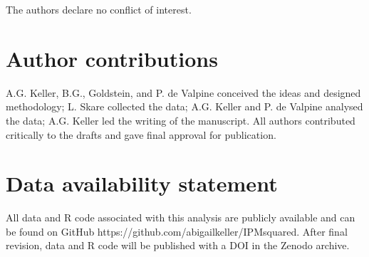 \documentclass{article}
\begin{document}
The authors declare no conflict of interest.

\section{Author contributions}

A.G. Keller, B.G., Goldstein, and P. de Valpine conceived the ideas and designed methodology; L. Skare collected the data; A.G. Keller and P. de Valpine analysed the data; A.G. Keller led the writing of the manuscript. All authors contributed critically to the drafts and gave final approval for publication.

\section{Data availability statement}

All data and R code associated with this analysis are publicly available and can be found on GitHub https://github.com/abigailkeller/IPMsquared. After final revision, data and R code will be published with a DOI in the Zenodo archive.
\end{document}
